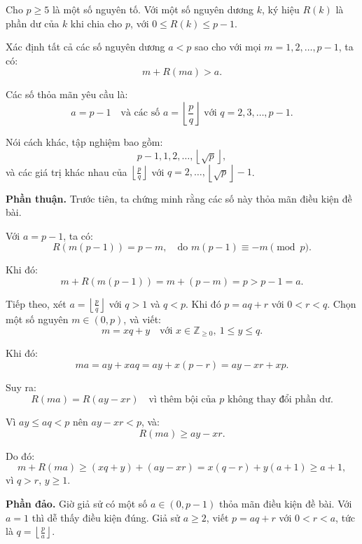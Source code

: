 \ifshowproblem
\begin{problem}\label{problem:RMM-2015-P5}
    Cho \( p \ge 5 \) là một số nguyên tố. Với một số nguyên dương \( k \), ký hiệu \( R(k) \) là phần dư của \( k \) khi chia cho \( p \),
    với \( 0 \le R(k) \le p - 1 \).

    Xác định tất cả các số nguyên dương \( a < p \) sao cho với mọi \( m = 1, 2, \ldots, p - 1 \), ta có:
    \[
        m + R(ma) > a.
    \]
\end{problem}
\fi

\ifshowsoln
\begin{soln}\footnotemark
    Các số thỏa mãn yêu cầu là:
    \[
        a = p - 1 \quad \text{và các số } a = \left\lfloor \frac{p}{q} \right\rfloor \text{ với } q = 2, 3, \ldots, p - 1.
    \]

    Nói cách khác, tập nghiệm bao gồm:
    \[
        p - 1, 1, 2, \ldots, \left\lfloor \sqrt{p} \right\rfloor,
    \]
    và các giá trị khác nhau của \( \left\lfloor \frac{p}{q} \right\rfloor \) với \( q = 2, \ldots, \left\lfloor \sqrt{p} \right\rfloor - 1 \).

    \textbf{Phần thuận.} Trước tiên, ta chứng minh rằng các số này thỏa mãn điều kiện đề bài.

    Với \( a = p - 1 \), ta có:
    \[
        R(m(p - 1)) = p - m, \quad \text{do } m(p - 1) \equiv -m \pmod{p}.
    \]

    Khi đó:
    \[
        m + R(m(p - 1)) = m + (p - m) = p > p - 1 = a.
    \]

    Tiếp theo, xét \( a = \left\lfloor \frac{p}{q} \right\rfloor \) với \( q > 1 \) và \( q < p \). Khi đó \( p = aq + r \) với \( 0 < r < q \).
    Chọn một số nguyên \( m \in (0, p) \), và viết:
    \[
        m = xq + y \quad \text{với } x \in \mathbb{Z}_{\ge 0},\ 1 \le y \le q.
    \]

    Khi đó:
    \[
        ma = ay + xaq = ay + x(p - r) = ay - xr + xp.
    \]

    Suy ra:
    \[
        R(ma) = R(ay - xr) \quad \text{vì thêm bội của } p \text{ không thay đổi phần dư}.
    \]

    Vì \( ay \le aq < p \) nên \( ay - xr < p \), và:
    \[
        R(ma) \ge ay - xr.
    \]

    Do đó:
    \[
        m + R(ma) \ge (xq + y) + (ay - xr) = x(q - r) + y(a + 1) \ge a + 1,
    \]
    vì \( q > r \), \( y \ge 1 \).

    \textbf{Phần đảo.} Giờ giả sử có một số \( a \in (0, p - 1) \) thỏa mãn điều kiện đề bài. 
    Với \( a = 1 \) thì dễ thấy điều kiện đúng. Giả sử \( a \ge 2 \), viết \( p = aq + r \) với \( 0 < r < a \), 
    tức là \( q = \left\lfloor \frac{p}{a} \right\rfloor \).


\end{soln}
